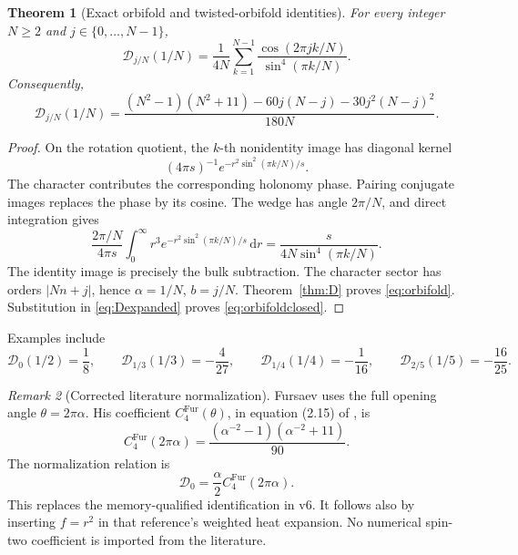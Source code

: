 \documentclass[11pt,a4paper]{article}
\newcommand{\dd}{\mathrm d}
\newcommand{\abs}[1]{\lvert#1\rvert}
\newcommand{\Dcal}{\mathcal D}
\theoremstyle{plain}
\newtheorem{theorem}{Theorem}[section]
\theoremstyle{definition}
\theoremstyle{remark}
\newtheorem{remark}[theorem]{Remark}
\numberwithin{equation}{section}
\begin{document}
\begin{theorem}[Exact orbifold and twisted-orbifold identities]
\label{thm:orbifold}
For every integer \(N\ge2\) and \(j\in\{0,\ldots,N-1\}\),
\begin{equation}
 \Dcal_{j/N}(1/N)
 =\frac1{4N}\sum_{k=1}^{N-1}
       \frac{\cos(2\pi jk/N)}{\sin^4(\pi k/N)}.
 \label{eq:orbifold}
\end{equation}
Consequently,
\begin{equation}
 \Dcal_{j/N}(1/N)
 =
 \frac{(N^2-1)(N^2+11)
       -60j(N-j)-30j^2(N-j)^2}{180N}.
 \label{eq:orbifoldclosed}
\end{equation}
\end{theorem}

\begin{proof}
On the rotation quotient, the \(k\)-th nonidentity image has
diagonal kernel
\[
 (4\pi s)^{-1}
       e^{-r^2\sin^2(\pi k/N)/s}.
\]
The character contributes the corresponding holonomy phase.
Pairing conjugate images replaces the phase by its cosine.
The wedge has angle \(2\pi/N\), and direct integration gives
\[
 \frac{2\pi/N}{4\pi s}
 \int_0^\infty r^3
 e^{-r^2\sin^2(\pi k/N)/s}\,\dd r
 =\frac{s}{4N\sin^4(\pi k/N)}.
\]
The identity image is precisely the bulk subtraction.
The character sector has orders \(\abs{Nn+j}\), hence
\(\alpha=1/N\), \(b=j/N\).
Theorem~\ref{thm:D} proves \eqref{eq:orbifold}.
Substitution in \eqref{eq:Dexpanded} proves
\eqref{eq:orbifoldclosed}.
\end{proof}

Examples include
\[
 \Dcal_0(1/2)=\frac18,\qquad
 \Dcal_{1/3}(1/3)=-\frac4{27},\qquad
 \Dcal_{1/4}(1/4)=-\frac1{16},\qquad
 \Dcal_{2/5}(1/5)=-\frac{16}{25}.
\]

\begin{remark}[Corrected literature normalization]
\label{rem:Fursaevnorm}
Fursaev uses the full opening angle \(\theta=2\pi\alpha\).
His coefficient \(C_4^{\mathrm{Fur}}(\theta)\), in
equation (2.15) of \cite{Fursaev1994}, is
\[
 C_4^{\mathrm{Fur}}(2\pi\alpha)
 =\frac{(\alpha^{-2}-1)(\alpha^{-2}+11)}{90}.
\]
The normalization relation is
\[
 \boxed{\ \Dcal_0=\frac{\alpha}{2}
                  C_4^{\mathrm{Fur}}(2\pi\alpha).\ }
\]
This replaces the memory-qualified identification in v6.
It follows also by inserting \(f=r^2\) in that reference's
weighted heat expansion. No numerical spin-two coefficient is
imported from the literature.
\end{remark}

\end{document}
